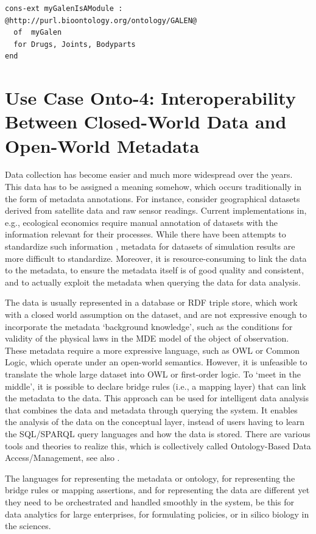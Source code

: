 \documentclass[10pt,fleqn,final]{scrreprt}
\newcommand*{\termref}[1]{\index{#1}#1\xspace}
\newenvironment{definitions}[0]{\medskip }{}
\begin{document}
\begin{definitions}
\begin{lstlisting}[basicstyle=\ttfamily,language=dolText,escapechar=@,mathescape]
cons-ext myGalenIsAModule : @http://purl.bioontology.org/ontology/GALEN@
  of  myGalen 
  for Drugs, Joints, Bodyparts
end
\end{lstlisting}
 


\section{Use Case Onto-4: Interoperability Between Closed-World Data and Open-World Metadata}
Data collection has become easier and much more widespread over the years. This data has to be 
assigned a meaning somehow, which occurs traditionally in the  form of metadata annotations. For 
instance, consider geographical datasets derived from satellite data and raw sensor readings. 
Current implementations in, e.g., ecological economics \cite{bagstad_aries_2011} require manual 
annotation of datasets with the information relevant for their processes. While there have been 
attempts to standardize such information \cite{european_comission_inspire_2014}, metadata for 
datasets of simulation results are more difficult to standardize. Moreover, it is 
resource-consuming to link the data to the metadata, to ensure the metadata itself is of good 
quality and consistent, and to actually exploit the metadata when querying the data for data 
analysis. 

The data is usually represented in a database or RDF triple store, which work with a \termref{closed world assumption} on the dataset, and are not expressive enough to 
incorporate the metadata `background knowledge', such as the conditions for validity of the physical laws in the MDE model of the object of observation. These metadata 
require a more expressive language, such as OWL or Common Logic, which operate under an open-world semantics. However, it is unfeasible to translate the 
whole large dataset into OWL or first-order logic. To `meet in the middle', it is possible to declare bridge rules (i.e., a mapping layer) that can link the metadata to 
the data. This approach can be used for intelligent data analysis that combines the data and metadata through querying the system. It enables the analysis of the 
data on the conceptual layer, instead of users having to learn the SQL/SPARQL query languages and how the data is stored. There are various tools and theories 
to realize this, which is collectively called Ontology-Based Data Access/Management, see also \cite{CalvaneseEtAl11}.

The languages for representing the metadata or ontology, for representing the bridge rules or mapping assertions, and for representing the data are different yet 
they need to be orchestrated and handled smoothly in the system, be this for data analytics for large enterprises, for formulating policies, or in silico biology in the 
sciences. 


\end{definitions}
\end{document}

